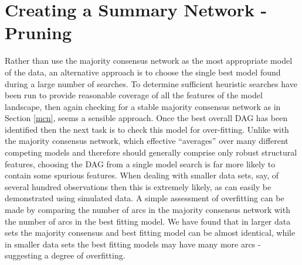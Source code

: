 \documentclass[nojss]{jss}
\begin{document}
\begin{Schunk}
\end{Schunk}


\section{Creating a Summary Network - Pruning}
Rather than use the majority consensus network as the most appropriate model of the data, an alternative approach is to choose the single best model found during a large number of searches. To determine sufficient heuristic searches have been run to provide reasonable coverage of all the features of the model landscape, then again checking for a stable majority consensus network as in Section \ref{mcn}, seems a sensible approach. Once the best overall DAG has been identified then the next task is to check this model for over-fitting. Unlike with the majority consensus network, which effective ``averages'' over many different competing models and therefore should generally comprise only robust structural features, choosing the DAG from a single model search is far more likely to contain some spurious features. When dealing with smaller data sets, say, of several hundred observations then this is extremely likely, as can easily be demonstrated using simulated data. A simple assessment of overfitting can be made by comparing the number of arcs in the majority consensus network with the number of arcs in the best fitting model. We have found that in larger data sets the majority consensus and best fitting model can be almost identical, while in smaller data sets the best fitting models may have many more arcs - suggesting a degree of overfitting. 
\end{document}
